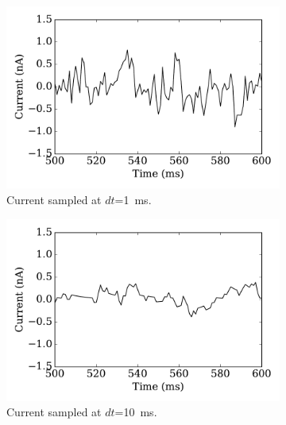 	\begin{figure}[tbp!]
		\centering
		  \par
		\begin{subfigure}[t]{0.43\textwidth}
			\includegraphics[width=\textwidth]{pics_iconip/curr_tau1.pdf}
			\caption{Current sampled at $dt$=1~ms.}
		\end{subfigure}
		\begin{subfigure}[t]{0.43\textwidth}
			\includegraphics[width=\textwidth]{pics_iconip/curr_tau10.pdf}
			\caption{Current sampled at $dt$=10~ms.}
		\end{subfigure}\\
		\begin{subfigure}[t]{0.43\textwidth}

\end{subfigure}
\end{figure}
